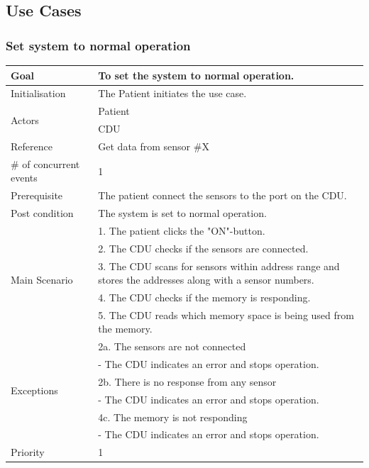 \subsection{Use Cases}

\subsubsection{Set system to normal operation}

\begin{table}[H]
	\centering
	\begin{tabular}{|l|p{10cm}|}
	\hline
	Goal 							& To set the system to normal operation. \\ \hline
	Initialisation 					& The Patient initiates the use case. \\ \hline
	\multirow{2}{*}{Actors} 		& Patient \\ 
									& CDU \\ \hline
	Reference 						& Get data from sensor \#X \\ \hline
	\# of concurrent events 		& 1 \\ \hline
	Prerequisite  					& The patient connect the sensors to the port on the CDU. \\ \hline
	Post condition 					& The system is set to normal operation. \\ \hline
	\multirow{5}{*}{Main Scenario} 	& 1. The patient clicks the  "ON"-button. \\
	& 2. The CDU checks if the sensors are connected.\\
	& 3. The CDU scans for sensors within address range and stores the addresses along with a sensor numbers.\\ 
	& 4. The CDU checks if the memory is responding.\\
	& 5. The CDU reads which memory space is being used from the memory.\\ \hline
	\multirow{6}{*}{Exceptions} & 2a. The sensors are not connected \\ 
								& - The CDU indicates an error and stops operation.\\											& 2b. There is no response from any sensor\\
								& - The CDU indicates an error and stops operation. \\
								& 4c. The memory is not responding\\
								& - The CDU indicates an error and stops operation. \\ 
								\hline
	Priority					& 1\\\hline
	\end{tabular}
\end{table}

